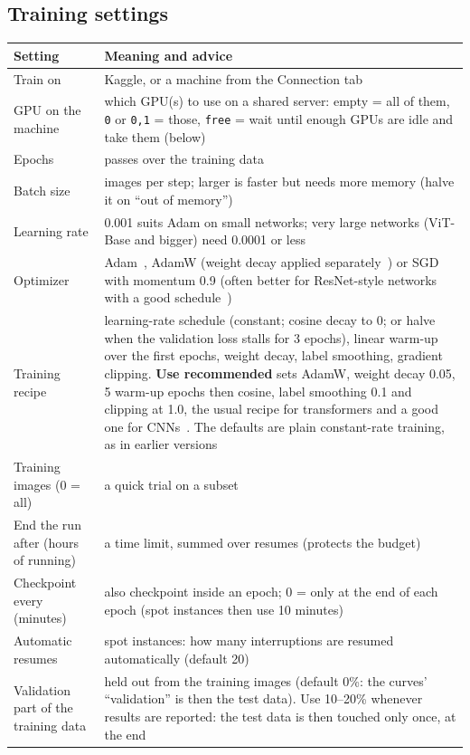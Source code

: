 \documentclass[11pt,a4paper]{article}
\newcommand{\ui}[1]{\textbf{\textsf{#1}}}
\begin{document}
\subsection{Training settings}
\begin{longtable}{@{}p{4.2cm}p{10.8cm}@{}}
\toprule
\textbf{Setting} & \textbf{Meaning and advice}\\
\midrule\endhead
Train on & Kaggle, or a machine from the Connection tab\\
GPU on the machine & which GPU(s) to use on a shared server: empty = all of them, \texttt{0} or \texttt{0,1} = those, \texttt{free} =
  wait until enough GPUs are idle and take them (below)\\
Epochs & passes over the training data\\
Batch size & images per step; larger is faster but needs more memory (halve it on ``out of memory'')\\
Learning rate & 0.001 suits Adam on small networks; very large networks (ViT-Base and bigger) need 0.0001 or less~\cite{steiner2021howtotrain}\\
Optimizer & Adam~\cite{kingma2014adam}, AdamW (weight decay applied separately~\cite{loshchilov2017adamw}) or SGD with momentum 0.9 (often better for ResNet-style networks with a good schedule~\cite{goyal2017accurate})\\
Training recipe & learning-rate schedule (constant; cosine decay to 0; or halve when the validation loss stalls for 3 epochs), linear warm-up over the first epochs, weight decay, label smoothing, gradient clipping. \ui{Use recommended} sets AdamW, weight decay 0.05, 5 warm-up epochs then cosine, label smoothing 0.1 and clipping at 1.0, the usual recipe for transformers and a good one for CNNs~\cite{steiner2021howtotrain,goyal2017accurate}. The defaults are plain constant-rate training, as in earlier versions\\
Training images (0 = all) & a quick trial on a subset\\
End the run after (hours of running) & a time limit, summed over resumes (protects the budget)\\
Checkpoint every (minutes) & also checkpoint inside an epoch; 0 = only at the end of each epoch (spot instances then use 10 minutes)\\
Automatic resumes & spot instances: how many interruptions are resumed automatically (default 20)\\
Validation part of the training data & held out from the training images (default 0\%: the curves' ``validation'' is then the test data). Use 10--20\% whenever results are reported: the test data is then touched only once, at the end\\

\end{longtable}
\end{document}
